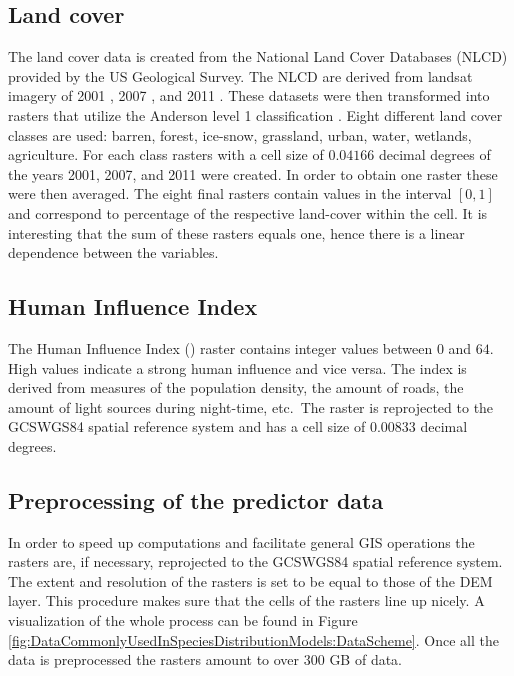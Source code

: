 \subsection{Land cover}
The land cover data is created from the National Land Cover Databases (NLCD) provided by the US Geological Survey. The NLCD are derived from landsat imagery of 2001 \parencite{vogelmann2001completion}, 2007 \parencite{homer2007completion}, and 2011 \parencite{fry2011completion}. These datasets were then transformed into rasters that utilize the Anderson level 1 classification \parencite{anderson_land_1976}. Eight different land cover classes are used: barren, forest, ice-snow, grassland, urban, water, wetlands, agriculture. For each class rasters with a cell size of $0.04166$ decimal degrees of the years 2001, 2007, and 2011 were created. In order to obtain one raster these were then averaged. The eight final rasters contain values in the interval $[0,1]$ and correspond to percentage of the respective land-cover within the cell. It is interesting that the sum of these rasters equals one, hence there is a linear dependence between the variables.

\subsection{Human Influence Index}
The Human Influence Index (\citeauthor{hii}) raster contains integer values between $0$ and $64$. High values indicate a strong human influence and vice versa. The index is derived from measures of the population density, the amount of roads, the amount of light sources during night-time, etc.\ The raster is reprojected to the GCS\textunderscore WGS84 spatial reference system and has a cell size of $0.00833$ decimal degrees.

\subsection{Preprocessing of the predictor data}

In order to speed up computations and facilitate general GIS operations the rasters are, if necessary, reprojected to the GCS\textunderscore WGS84 spatial reference system. The extent and resolution of the rasters is set to be equal to those of the DEM layer. This procedure makes sure that the cells of the rasters line up nicely. A visualization of the whole process can be found in Figure \ref{fig:DataCommonlyUsedInSpeciesDistributionModels:DataScheme}. Once all the data is preprocessed the rasters amount to over $300$ GB of data.

